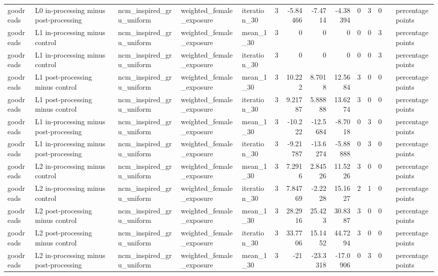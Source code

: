 \begin{table}[htbp!]
\begin{tabular}{lllllrrrrrrrll}
goodreads & L0 in-processing minus post-processing & ncm\_inspired\_gru\_uniform & weighted\_female\_exposure & iteration\_30 & 3 & -5.84466 & -7.4714 & -4.38394 & 0 & 3 & 0 &  & percentage points \\
goodreads & L1 in-processing minus control & ncm\_inspired\_gru\_uniform & weighted\_female\_exposure & mean\_1\_30 & 3 & 0 & 0 & 0 & 0 & 0 & 3 &  & percentage points \\
goodreads & L1 in-processing minus control & ncm\_inspired\_gru\_uniform & weighted\_female\_exposure & iteration\_30 & 3 & 0 & 0 & 0 & 0 & 0 & 3 &  & percentage points \\
goodreads & L1 post-processing minus control & ncm\_inspired\_gru\_uniform & weighted\_female\_exposure & mean\_1\_30 & 3 & 10.222 & 8.7018 & 12.5684 & 3 & 0 & 0 &  & percentage points \\
goodreads & L1 post-processing minus control & ncm\_inspired\_gru\_uniform & weighted\_female\_exposure & iteration\_30 & 3 & 9.21787 & 5.88888 & 13.6274 & 3 & 0 & 0 &  & percentage points \\
goodreads & L1 in-processing minus post-processing & ncm\_inspired\_gru\_uniform & weighted\_female\_exposure & mean\_1\_30 & 3 & -10.222 & -12.5684 & -8.7018 & 0 & 3 & 0 &  & percentage points \\
goodreads & L1 in-processing minus post-processing & ncm\_inspired\_gru\_uniform & weighted\_female\_exposure & iteration\_30 & 3 & -9.21787 & -13.6274 & -5.88888 & 0 & 3 & 0 &  & percentage points \\
goodreads & L2 in-processing minus control & ncm\_inspired\_gru\_uniform & weighted\_female\_exposure & mean\_1\_30 & 3 & 7.2916 & 2.84526 & 11.5226 & 3 & 0 & 0 &  & percentage points \\
goodreads & L2 in-processing minus control & ncm\_inspired\_gru\_uniform & weighted\_female\_exposure & iteration\_30 & 3 & 7.84769 & -2.2228 & 15.1627 & 2 & 1 & 0 &  & percentage points \\
goodreads & L2 post-processing minus control & ncm\_inspired\_gru\_uniform & weighted\_female\_exposure & mean\_1\_30 & 3 & 28.2916 & 25.423 & 30.8387 & 3 & 0 & 0 &  & percentage points \\
goodreads & L2 post-processing minus control & ncm\_inspired\_gru\_uniform & weighted\_female\_exposure & iteration\_30 & 3 & 33.7706 & 15.1452 & 44.7294 & 3 & 0 & 0 &  & percentage points \\
goodreads & L2 in-processing minus post-processing & ncm\_inspired\_gru\_uniform & weighted\_female\_exposure & mean\_1\_30 & 3 & -21 & -23.3318 & -17.0906 & 0 & 3 & 0 &  & percentage points \\

\end{tabular}
\end{table}
